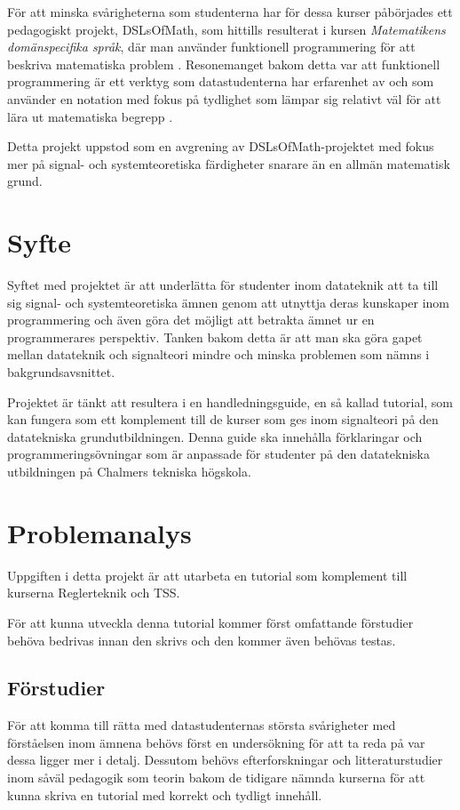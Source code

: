 \documentclass{article}
\begin{document}
För att minska svårigheterna som studenterna har för dessa kurser
påbörjades ett pedagogiskt projekt, DSLsOfMath, som hittills
resulterat i kursen \textit{Matematikens domänspecifika språk}, där man
använder funktionell programmering för att beskriva matematiska problem \cite{kursplan:dslsofmath}.
Resonemanget bakom detta var att funktionell programmering är ett
verktyg som datastudenterna har erfarenhet av och som använder en
notation med fokus på tydlighet som lämpar sig relativt väl för
att lära ut matematiska begrepp \cite{tfpie}.

Detta projekt uppstod som en avgrening av DSLsOfMath-projektet med
fokus mer på signal- och systemteoretiska färdigheter snarare än
en allmän matematisk grund.

\section{Syfte}
Syftet med projektet är att underlätta för studenter inom datateknik
att ta till sig signal- och systemteoretiska ämnen genom att utnyttja
deras kunskaper inom programmering och även göra det möjligt att
betrakta ämnet ur en programmerares perspektiv.
Tanken bakom detta är att man ska göra gapet mellan
datateknik och signalteori mindre och minska problemen
som nämns i bakgrundsavsnittet.

Projektet är tänkt att resultera i en handledningsguide, en så kallad
tutorial, som kan fungera som ett komplement till de kurser som ges
inom signalteori på den datatekniska grundutbildningen.
Denna guide ska innehålla förklaringar och programmeringsövningar
som är anpassade för studenter på den datatekniska utbildningen på Chalmers tekniska högskola.

\section{Problemanalys}
Uppgiften i detta projekt är att utarbeta en tutorial som
komplement till kurserna Reglerteknik och TSS.

För att kunna utveckla denna tutorial kommer först omfattande
förstudier behöva bedrivas innan den skrivs och den kommer även behövas testas.

\subsection{Förstudier}
För att komma till rätta med datastudenternas
största svårigheter med förståelsen inom ämnena
behövs först en undersökning för att ta reda på
var dessa ligger mer i detalj.
Dessutom behövs efterforskningar och litteraturstudier
inom såväl pedagogik som teorin bakom de tidigare
nämnda kurserna för att kunna skriva en tutorial
med korrekt och tydligt innehåll.
\end{document}

